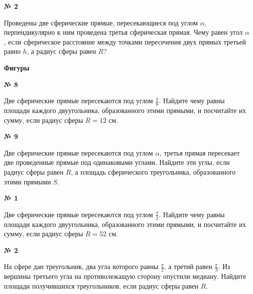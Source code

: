    \begin{center}
        \textbf{№ 2}
    \end{center}

    Проведены две сферические прямые, пересекающиеся под углом $\alpha$,
    перпендикулярно к ним проведена третья сферическая прямая.
    Чему равен угол $\alpha$, если сферическое расстояние между точками пересечения
    двух прямых третьей равно $h$, а радиус сферы равен $R$?

    \begin{center}
        \textbf{Фигуры}
    \end{center}

    \begin{center}
        \textbf{№ 8}
    \end{center}
    Две сферические прямые пересекаются под углом $\frac{\pi}{6}$.
    Найдите чему равны площади каждого двуугольника, образованного этими прямыми, и посчитайте их сумму,
    если радиус сферы $R=12$ см.

    \begin{center}
        \textbf{№ 9}
    \end{center}

    Две сферические прямые пересекаются под углом $\alpha$, третья прямая пересекает две проведенные прямые
    под одинаковыми углами.
    Найдите эти углы, если радиус сферы равен $R$, а площадь сферического треугольника, образованного этими прямыми $S$.

    \begin{center}
        \textbf{№ 1}
    \end{center}

     Две сферические прямые пересекаются под углом $\frac{\pi}{2}$.
    Найдите чему равны площади каждого двуугольника, образованного этими прямыми, и посчитайте их сумму,
    если радиус сферы $R=52$ см.

    \begin{center}
        \textbf{№ 2}
    \end{center}

    На сфере дан треугольник, два угла которого равны $\frac{\pi}{2}$, а третий равен $\frac{\pi}{3}$.
    Из вершины третьего угла на противолежащую сторону опустили медиану.
    Найдите площади получившихся треугольников, если радиус сферы равен $R$.

